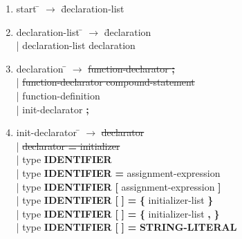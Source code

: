 \small
\begin{enumerate}
\item \begin{tabbing} start \= $\rightarrow$ \= declaration-list \\
\end{tabbing}

\item \begin{tabbing} declaration-list \= $\rightarrow$ \= declaration \\
	\> \hspace*{0.05cm} | \> declaration-list declaration \\
\end{tabbing}

\item \begin{tabbing} declaration \= $\rightarrow$ \= \sout{function-declarator \textbf{;}} \\
	\> \hspace*{0.05cm} | \> \sout{function-declarator compound-statement} \\
	\> \hspace*{0.05cm} | \> function-definition \\
	\> \hspace*{0.05cm} | \> init-declarator \textbf{;} \\
\end{tabbing}

\item \begin{tabbing} init-declarator \= $\rightarrow$ \= \sout{declarator} \\
	\> \hspace*{0.05cm} | \> \sout{declarator \textbf{=} initializer} \\
	\> \hspace*{0.05cm} | \> type \textbf{IDENTIFIER}                                                                                                 \\
	\> \hspace*{0.05cm} | \> type \textbf{IDENTIFIER} \textbf{=} assignment-expression                                                              \\
	\> \hspace*{0.05cm} | \> type \textbf{IDENTIFIER} \textbf{[} assignment-expression \textbf{]}                                                 \\
	\> \hspace*{0.05cm} | \> type \textbf{IDENTIFIER} \textbf{[} \textbf{]} \textbf{=} \textbf{\{} initializer-list \textbf{\}}               \\
	\> \hspace*{0.05cm} | \> type \textbf{IDENTIFIER} \textbf{[} \textbf{]} \textbf{=} \textbf{\{} initializer-list \textbf{,} \textbf{\}}  \\
	\> \hspace*{0.05cm} | \> type \textbf{IDENTIFIER} \textbf{[} \textbf{]} \textbf{=} \textbf{STRING-LITERAL}                                  \\
\end{tabbing}



\end{enumerate}
